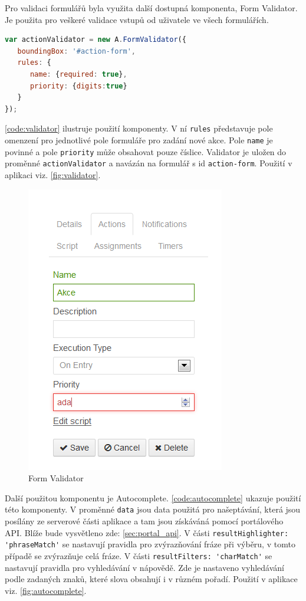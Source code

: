 \documentclass{fithesis}
\begin{document}
Pro validaci formulářů byla využita další dostupná komponenta, Form Validator. Je použita pro veškeré validace vstupů od uživatele ve všech formulářích.

\begin{lstlisting}[language=JavaScript , caption = Použítí komponenty Form Validator , label = code:validator]
var actionValidator = new A.FormValidator({
   boundingBox: '#action-form', 
   rules: {
      name: {required: true},
      priority: {digits:true}
   }
});
\end{lstlisting}

\autoref{code:validator} ilustruje použití komponenty. V ní \verb|rules| představuje pole omenzení pro jednotlivé pole formuláře pro zadání nové akce. Pole \verb|name| je povinné a pole \verb|priority| může obsahovat pouze číslice. Validator je uložen do proměnné \verb|actionValidator| a navázán na formulář s id \verb|action-form|. Použití v aplikaci viz. \autoref{fig:validator}.

\begin{figure}[htp]
\centering
\includegraphics{images/validator.png}
\caption{Form Validator}
\label{fig:validator}
\end{figure}

Další použitou komponentu  je Autocomplete. \autoref{code:autocomplete} ukazuje použití této komponenty. V proměnné \verb|data| jsou data použitá pro našeptávání, která jsou posílány ze serverové části aplikace a tam jsou získáváná pomocí portálového API. Blíže bude vysvětleno zde: \autoref{sec:portal_api}. V části \verb|resultHighlighter: 'phraseMatch'| se nastavují pravidla pro zvýrazňování fráze při výběru, v tomto případě se zvýrazňuje celá fráze. V části \verb|resultFilters: 'charMatch'| se  nastavují pravidla pro vyhledávání v nápovědě. Zde je nastaveno  vyhledávání podle zadaných znaků, které slova obsahují i v různém pořadí. Použití v aplikace viz. \autoref{fig:autocomplete}.
\end{document}
